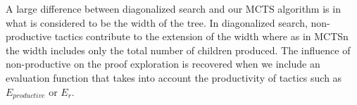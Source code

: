 \documentclass[runningheads,a4paper,draft]{svjour3}
\DeclareMathOperator*{\argmax}{\arg\!\max}
\begin{document}
A large difference between diagonalized search and our MCTS algorithm is in 
what is considered to be the width of the tree. In diagonalized search, 
non-productive tactics contribute to the extension of the width where as in 
MCTSn the width includes only the total number of children produced. The 
influence of non-productive on the proof exploration is recovered when we 
include an 
evaluation function that takes into account the productivity of tactics such as 
$E_{productive}$ or $E_r$.





%
%
%
%
%
%
% 

%


%
%
\end{document}
